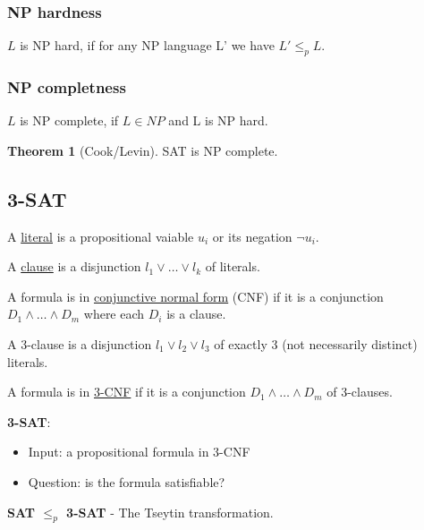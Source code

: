 \documentclass[a4paper,12pt]{article}
\theoremstyle{definition}
\newtheorem{theorem}[counter]{Theorem}
\theoremstyle{remark}
\begin{document}
\subsubsection*{NP hardness}

$L$ is NP hard, if for any NP language L' we have $L' \leq_p L$.

\subsubsection*{NP completness}

$L$ is NP complete, if $L \in NP$ and L is NP hard.

\begin{theorem}[Cook/Levin]
    SAT is NP complete.
\end{theorem}

\subsection{3-SAT}

A \underline{literal} is a propositional vaiable $u_i$ or its negation $\neg u_i$.

A \underline{clause} is a disjunction $l_1 \lor \dots \lor l_k$ of literals.

A formula is in \underline{conjunctive normal form} (CNF) if it is a conjunction $D_1 \land \dots \land D_m$ where each $D_i$ is a clause.

A 3-clause is a disjunction $l_1 \lor l_2 \lor l_3$ of exactly 3 (not necessarily distinct) literals.

A formula is in \underline{3-CNF} if it is a conjunction $D_1 \land \dots \land D_m$ of 3-clauses.

\textbf{3-SAT}:
\begin{itemize}
    \item Input: a propositional formula in 3-CNF
    \item Question: is the formula satisfiable?
\end{itemize}

\textbf{SAT $\leq_p$ 3-SAT} - The Tseytin transformation.
\end{document}
